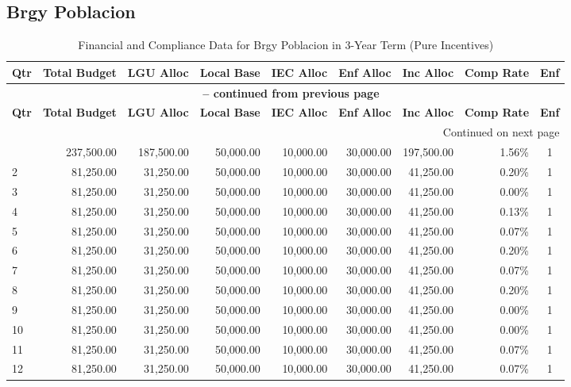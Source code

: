 \subsection{Brgy Poblacion}
\begin{longtable}{lrrrrrrrc}
\caption{Financial and Compliance Data for Brgy Poblacion in 3-Year Term (Pure Incentives)} \\
\toprule
\textbf{Qtr} & \textbf{Total Budget} & \textbf{LGU Alloc} & \textbf{Local Base} & \textbf{IEC Alloc} & \textbf{Enf Alloc} & \textbf{Inc Alloc} & \textbf{Comp Rate} & \textbf{Enf} \\
\midrule
\endfirsthead
\multicolumn{9}{c}{{\bfseries \tablename\ \thetable{} -- continued from previous page}} \\
\toprule
\textbf{Qtr} & \textbf{Total Budget} & \textbf{LGU Alloc} & \textbf{Local Base} & \textbf{IEC Alloc} & \textbf{Enf Alloc} & \textbf{Inc Alloc} & \textbf{Comp Rate} & \textbf{Enf} \\
\midrule
\endhead
\hline \multicolumn{9}{r}{{Continued on next page}} \\ \hline
\endfoot
\bottomrule
\endlastfoot
1 & 237,500.00 & 187,500.00 & 50,000.00 & 10,000.00 & 30,000.00 & 197,500.00 & 1.56\% & 1 \\
2 & 81,250.00 & 31,250.00 & 50,000.00 & 10,000.00 & 30,000.00 & 41,250.00 & 0.20\% & 1 \\
3 & 81,250.00 & 31,250.00 & 50,000.00 & 10,000.00 & 30,000.00 & 41,250.00 & 0.00\% & 1 \\
4 & 81,250.00 & 31,250.00 & 50,000.00 & 10,000.00 & 30,000.00 & 41,250.00 & 0.13\% & 1 \\
5 & 81,250.00 & 31,250.00 & 50,000.00 & 10,000.00 & 30,000.00 & 41,250.00 & 0.07\% & 1 \\
6 & 81,250.00 & 31,250.00 & 50,000.00 & 10,000.00 & 30,000.00 & 41,250.00 & 0.20\% & 1 \\
7 & 81,250.00 & 31,250.00 & 50,000.00 & 10,000.00 & 30,000.00 & 41,250.00 & 0.07\% & 1 \\
8 & 81,250.00 & 31,250.00 & 50,000.00 & 10,000.00 & 30,000.00 & 41,250.00 & 0.20\% & 1 \\
9 & 81,250.00 & 31,250.00 & 50,000.00 & 10,000.00 & 30,000.00 & 41,250.00 & 0.00\% & 1 \\
10 & 81,250.00 & 31,250.00 & 50,000.00 & 10,000.00 & 30,000.00 & 41,250.00 & 0.00\% & 1 \\
11 & 81,250.00 & 31,250.00 & 50,000.00 & 10,000.00 & 30,000.00 & 41,250.00 & 0.07\% & 1 \\
12 & 81,250.00 & 31,250.00 & 50,000.00 & 10,000.00 & 30,000.00 & 41,250.00 & 0.07\% & 1 \\
\end{longtable}